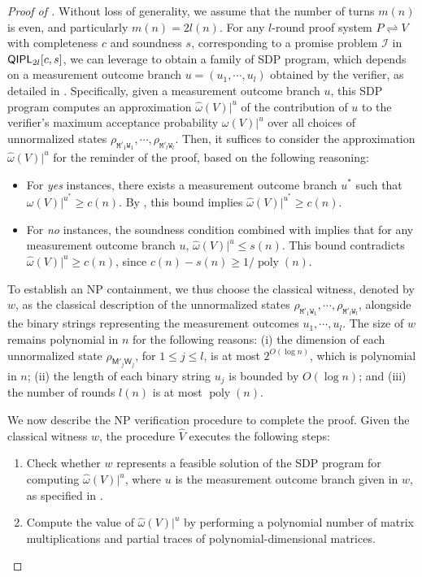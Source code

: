 \documentclass[10pt,a4paper]{article}
\numberwithin{equation}{section}
\numberwithin{figure}{section}
\newcommand{\NP}{\textnormal{\textsf{NP}}\xspace}
\newcommand{\QIPL}{\textnormal{\textsf{QIPL}}\xspace}
\newcommand{\protocol}[2]{{#1}\!\rightleftharpoons\!{#2}}
\DeclareMathOperator\poly{poly}
\newcommand{\calI}{\mathcal{I}}
\newcommand{\sfM}{\mathsf{M}}
\newcommand{\sfW}{\mathsf{W}}
\newcommand{\ttM}{\mathtt{M}}
\newcommand{\ttW}{\mathtt{W}}
\newcommand{\hatV}{\widehat{V}}
\begin{document}
\begin{proof}[Proof of ]
    Without loss of generality, we assume that the number of turns $m(n)$ is even, and particularly $m(n) = 2l(n)$. 
    For any $l$-round proof system $\protocol{P}{V}$ with completeness $c$ and soundness $s$, corresponding to a promise problem $\calI$ in $\QIPL_{2l}[c,s]$, we can leverage  to obtain a family of SDP program, which depends on a measurement outcome branch $u=(u_1,\cdots,u_l)$ obtained by the verifier, as detailed in . Specifically, given a measurement outcome branch $u$, this SDP program computes an approximation $\widehat{\omega}(V)|^u$ of the contribution of $u$ to the verifier's maximum acceptance probability $\omega(V)|^u$ over all choices of unnormalized states $\rho_{\ttM'_1\ttW_1}, \cdots, \rho_{\ttM'_l\ttW_l}$. 
    Then, it suffices to consider the approximation $\widehat{\omega}(V)|^u$ for the reminder of the proof, based on the following reasoning:
    \begin{itemize}
        \item For \textit{yes} instances, there exists a measurement outcome branch $u^*$ such that $\omega(V)|^{u^*} \geq c(n)$. By , this bound implies $\widehat{\omega}(V)|^{u^*} \geq c(n)$. 
        \item For \textit{no} instances, the soundness condition combined with  implies that for any measurement outcome branch $u$, $\widehat{\omega}(V)|^u \leq s(n)$. This bound contradicts $\widehat{\omega}(V)|^u \geq c(n)$, since $c(n)-s(n) \geq 1/\poly(n)$. 
    \end{itemize}

    To establish an \NP{} containment, we thus choose the classical witness, denoted by $w$, as the classical description of the unnormalized states $\rho_{\ttM'_1\ttW_1}, \cdots, \rho_{\ttM'_l\ttW_l}$, alongside the binary strings representing the measurement outcomes $u_1,\cdots,u_l$. The size of $w$ remains polynomial in $n$ for the following reasons: (i) the dimension of each unnormalized state $\rho_{\sfM'_j\sfW_j}$, for $1 \leq j \leq l$, is at most $2^{O(\log n)}$, which is polynomial in $n$; (ii) the length of each binary string $u_j$ is bounded by $O(\log n)$; and (iii) the number of rounds $l(n)$ is at most $\poly(n)$. 

    We now describe the \NP{} verification procedure to complete the proof. Given the classical witness $w$, the procedure $\hatV$ executes the following steps:
    \begin{enumerate}[label={\upshape(\arabic*)}, topsep=0.33em, itemsep=0.33em, parsep=0.33em] 
        \item Check whether $w$ represents a feasible solution of the SDP program for computing $\widehat{\omega}(V)|^u$, where $u$ is the measurement outcome branch given in $w$, as specified in . 
        \item Compute the value of $\widehat{\omega}(V)|^u$ by performing a polynomial number of matrix multiplications and partial traces of polynomial-dimensional matrices. 
    \end{enumerate}
    

\end{proof}
\end{document}
